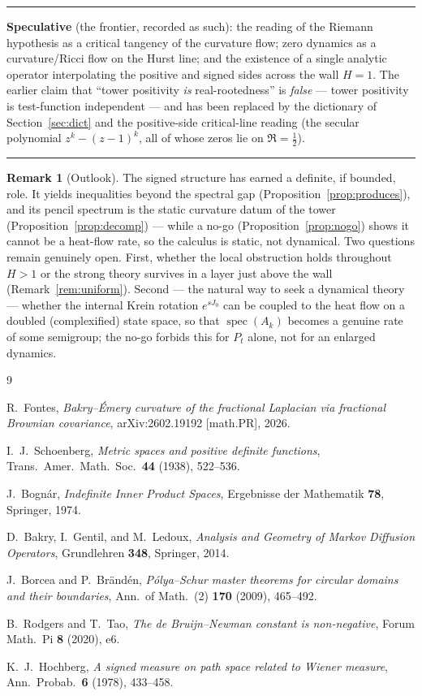 \documentclass[11pt,reqno]{amsart}
\theoremstyle{plain}
\theoremstyle{definition}
\newtheorem{remark}[theorem]{Remark}
\newenvironment{ledger}
  {\par\medskip\noindent\rule{\linewidth}{0.4pt}\par\nopagebreak\smallskip\small}
  {\par\nopagebreak\smallskip\noindent\rule{\linewidth}{0.4pt}\par\medskip}
\DeclareMathOperator{\spec}{spec}
\begin{document}
\begin{ledger}
\smallskip\noindent\textbf{Speculative} (the frontier, recorded as such):
the reading of the Riemann hypothesis as a critical tangency of the curvature
flow; zero dynamics as a curvature/Ricci flow on the Hurst line; and the existence
of a single analytic operator interpolating the positive and signed sides across
the wall $H=1$. The earlier claim that ``tower positivity \emph{is}
real-rootedness'' is \emph{false} --- tower positivity is test-function
independent --- and has been replaced by the dictionary of
Section~\ref{sec:dict} and the positive-side critical-line reading (the secular
polynomial $z^{k}-(z-1)^{k}$, all of whose zeros lie on $\Re=\tfrac12$).
\end{ledger}

\begin{remark}[Outlook]
The signed structure has earned a definite, if bounded, role. It yields
inequalities beyond the spectral gap (Proposition~\ref{prop:produces}), and its
pencil spectrum is the static curvature datum of the tower
(Proposition~\ref{prop:decomp}) --- while a no-go (Proposition~\ref{prop:nogo})
shows it cannot be a heat-flow rate, so the calculus is static, not dynamical. Two
questions remain genuinely open. First, whether the local obstruction holds
throughout $H>1$ or the strong theory survives in a layer just above the wall
(Remark~\ref{rem:uniform}). Second --- the natural way to seek a dynamical theory ---
whether the internal Krein rotation $e^{sJ_0}$ can be coupled to the heat flow on a
doubled (complexified) state space, so that $\spec(A_k)$ becomes a genuine rate of
some semigroup; the no-go forbids this for $P_t$ alone, not for an enlarged
dynamics.
\end{remark}

\begin{thebibliography}{9}

R.~Fontes,
\emph{Bakry--\'Emery curvature of the fractional Laplacian via fractional
Brownian covariance},
arXiv:2602.19192 [math.PR], 2026.

I.~J.~Schoenberg,
\emph{Metric spaces and positive definite functions},
Trans.\ Amer.\ Math.\ Soc.\ \textbf{44} (1938), 522--536.

J.~Bogn\'ar,
\emph{Indefinite Inner Product Spaces},
Ergebnisse der Mathematik \textbf{78}, Springer, 1974.

D.~Bakry, I.~Gentil, and M.~Ledoux,
\emph{Analysis and Geometry of Markov Diffusion Operators},
Grundlehren \textbf{348}, Springer, 2014.

J.~Borcea and P.~Br\"and\'en,
\emph{P\'olya--Schur master theorems for circular domains and their boundaries},
Ann.\ of Math.\ (2) \textbf{170} (2009), 465--492.

B.~Rodgers and T.~Tao,
\emph{The de Bruijn--Newman constant is non-negative},
Forum Math.\ Pi \textbf{8} (2020), e6.

K.~J.~Hochberg,
\emph{A signed measure on path space related to Wiener measure},
Ann.\ Probab.\ \textbf{6} (1978), 433--458.

\end{thebibliography}
\end{document}
